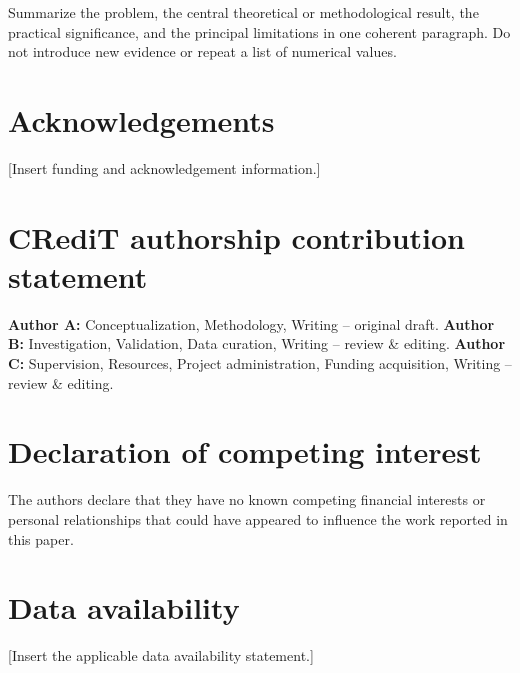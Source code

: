 \documentclass[final,3p,times,twocolumn]{elsarticle}
\begin{document}
Summarize the problem, the central theoretical or methodological result, the practical significance, and the principal limitations in one coherent paragraph. Do not introduce new evidence or repeat a list of numerical values.

\section*{Acknowledgements}
[Insert funding and acknowledgement information.]

\section*{CRediT authorship contribution statement}
\textbf{Author A:} Conceptualization, Methodology, Writing -- original draft. \textbf{Author B:} Investigation, Validation, Data curation, Writing -- review \& editing. \textbf{Author C:} Supervision, Resources, Project administration, Funding acquisition, Writing -- review \& editing.

\section*{Declaration of competing interest}
The authors declare that they have no known competing financial interests or personal relationships that could have appeared to influence the work reported in this paper.

\section*{Data availability}
[Insert the applicable data availability statement.]



\end{document}
